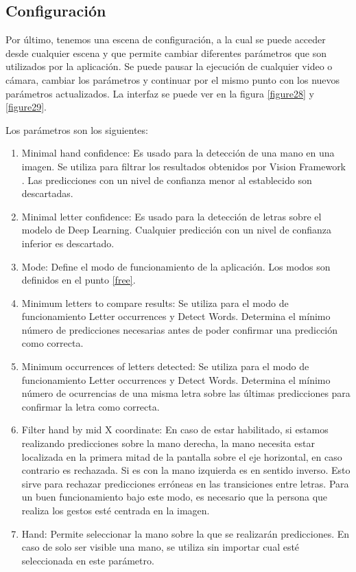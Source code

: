 \documentclass[../main.tex]{subfiles}
\begin{document}
\subsection{Configuración}

Por último, tenemos una escena de configuración, a la cual se puede acceder desde cualquier escena y que permite cambiar diferentes parámetros que son utilizados por la aplicación. Se puede pausar la ejecución de cualquier video o cámara, cambiar los parámetros y continuar por el mismo punto con los nuevos parámetros actualizados. La interfaz se puede ver en la figura \ref{figure28} y \ref{figure29}.

Los parámetros son los siguientes:
\begin{enumerate}
    \item Minimal hand confidence: Es usado para la detección de una mano en una imagen. Se utiliza para filtrar los resultados obtenidos por Vision Framework \cite{Vision}. Las predicciones con un nivel de confianza menor al establecido son descartadas.
    \item Minimal letter confidence: Es usado para la detección de letras sobre el modelo de Deep Learning. Cualquier predicción con un nivel de confianza inferior es descartado.
    \item Mode: Define el modo de funcionamiento de la aplicación. Los modos son definidos en el punto \ref{free}.
    \item Minimum letters to compare results: Se utiliza para el modo de funcionamiento Letter occurrences y Detect Words. Determina el mínimo número de predicciones necesarias antes de poder confirmar una predicción como correcta.
    \item Minimum occurrences of letters detected: Se utiliza para el modo de funcionamiento Letter occurrences y Detect Words. Determina el mínimo número de ocurrencias de una misma letra sobre las últimas predicciones para confirmar la letra como correcta. 
    \item Filter hand by mid X coordinate: En caso de estar habilitado, si estamos realizando predicciones sobre la mano derecha, la mano necesita estar localizada en la primera mitad de la pantalla sobre el eje horizontal, en caso contrario es rechazada. Si es con la mano izquierda es en sentido inverso. Esto sirve para rechazar predicciones erróneas en las transiciones entre letras. Para un buen funcionamiento bajo este modo, es necesario que la persona que realiza los gestos esté centrada en la imagen.
    \item Hand: Permite seleccionar la mano sobre la que se realizarán predicciones. En caso de solo ser visible una mano, se utiliza sin importar cual esté seleccionada en este parámetro.

\end{enumerate}
\end{document}
